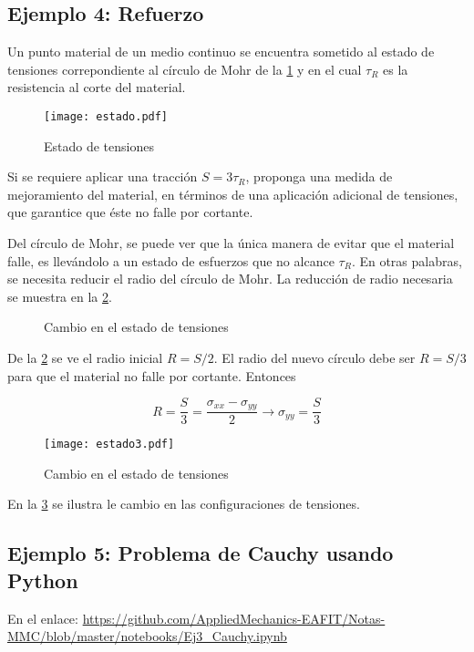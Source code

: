 \documentclass[../notas medios.tex]{subfiles}
\begin{document}
\subsection*{Ejemplo 4: Refuerzo}

Un punto material de un medio continuo se encuentra sometido al estado de tensiones correpondiente al círculo de Mohr de la \cref{estado} y en el cual  $\tau_R$ es la resistencia al corte del material.

\begin{figure}[h]
	\centering
	\texttt{[image: estado.pdf]} 
	\caption{Estado de tensiones}
	\label{estado}
\end{figure}

Si se requiere aplicar una tracción $S = 3\tau_R$,  proponga una medida de mejoramiento del material, en términos de una aplicación adicional de tensiones, que garantice que éste no falle por cortante.

Del círculo de Mohr, se puede ver que la única manera de evitar que el material falle, es llevándolo a un estado de esfuerzos que no alcance $\tau_R$. En otras palabras, se necesita reducir el radio del círculo de Mohr. La reducción de radio necesaria se muestra en la \cref{modif}. 


\begin{figure}[H]
	\centering
	\caption{Cambio en el estado de tensiones}
	\label{modif}
\end{figure}

De la \cref{modif} se ve el radio inicial $R=S/2$. El radio del nuevo círculo debe ser $R=S/3$ para que el material no falle por cortante. Entonces


\begin{equation*}
R = \frac{S}{3} =  \frac{\sigma_{xx} - \sigma_{yy}}{2} \rightarrow
\sigma_{yy} = \frac{S}{3}
\end{equation*}

\begin{figure}[h]
	\centering
	\texttt{[image: estado3.pdf]} 
	\caption{Cambio en el estado de tensiones}
	\label{estado3}
\end{figure}

En la \cref{estado3} se ilustra le cambio en las configuraciones de tensiones.


\subsection*{Ejemplo 5: Problema de Cauchy usando Python}
En el enlace: 
%
 {\url{https://github.com/AppliedMechanics-EAFIT/Notas-MMC/blob/master/notebooks/Ej3_Cauchy.ipynb}}
%
\end{document}
